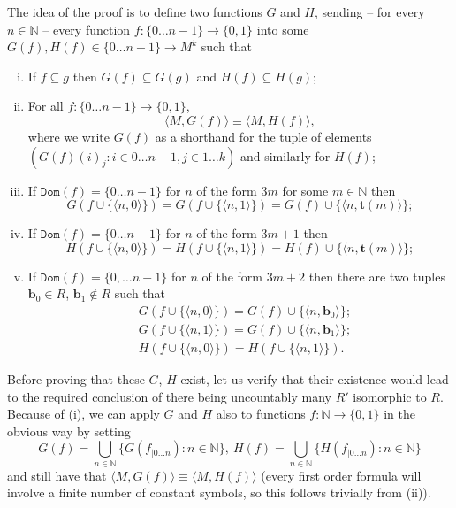 \documentclass{article}
\theoremstyle{definition}
\newcommand{\tuple}{\mathbf}
\newcommand{\dom}{\texttt{Dom}}
\begin{document}
	The idea of the proof is to define two functions $G$ and $H$, sending -- for every $n \in \mathbb N$ -- every function $f: \{0 \ldots n-1\} \rightarrow \{0,1\}$ into some $G(f), H(f) \in \{0 \ldots n-1\} \rightarrow M^k$ such that
	\begin{enumerate}[(i)]
		\item If $f \subseteq g$ then $G(f) \subseteq G(g)$ and $H(f) \subseteq H(g)$; 
		\item For all $f: \{0 \ldots n-1\} \rightarrow \{0,1\}$, 
			\[
				\langle M, G(f)\rangle \equiv \langle M, H(f)\rangle, 
			\]
			where we write $G(f)$ as a shorthand for the tuple of elements $(G(f)(i)_j : i \in 0 \ldots n-1, j \in 1 \ldots k)$ and similarly for $H(f)$; 
		\item If $\dom(f) = \{0 \ldots n-1\}$ for $n$ of the form $3m$ for some $m \in \mathbb N$ then 
			\[
				G(f \cup \{\langle n, 0\rangle\}) = G(f \cup \{\langle n, 1\rangle \}) = G(f) \cup \{\langle n, \tuple t(m)\rangle\};
			\]
		\item If $\dom(f) = \{0 \ldots n-1\}$ for $n$ of the form $3m+1$ then 
			\[
				H(f \cup \{\langle n, 0\rangle\}) = H(f \cup \{\langle n, 1\rangle \}) = H(f) \cup \{\langle n, \tuple t(m)\rangle\};
			\]
		\item If $\dom(f) = \{0, \ldots n-1\}$ for $n$ of the form $3m+2$ then there are two tuples $\tuple b_0 \in R$, $\tuple b_1 \not \in R$ such that
			\begin{align*}
				& G(f \cup \{\langle n, 0\rangle\}) = G(f) \cup \{\langle n, \tuple b_0\rangle\};\\
				& G(f \cup \{\langle n, 1\rangle\}) = G(f) \cup \{\langle n, \tuple b_1\rangle\};\\
				& H(f \cup \{\langle n, 0\rangle\}) = H(f \cup \{\langle n,1\rangle\}).
			\end{align*}
	\end{enumerate}
	Before proving that these $G$, $H$ exist, let us verify that their existence would lead to the required conclusion of there being uncountably many $R'$ isomorphic to $R$. Because of (i), we can apply $G$ and $H$ also to functions $f: \mathbb N \rightarrow \{0,1\}$ in the obvious way by setting 
	\[
		G(f) = \bigcup_{n \in \mathbb N} \{G(f_{|0 \ldots n}) : n \in \mathbb N\},~ H(f) = \bigcup_{n \in \mathbb N} \{H(f_{|0 \ldots n}) : n \in \mathbb N\}
	\]
	and still have that $\langle M, G(f) \rangle \equiv \langle M, H(f)\rangle$ (every first order formula will involve a finite number of constant symbols, so this follows trivially from (ii)). 
	
\end{document}
